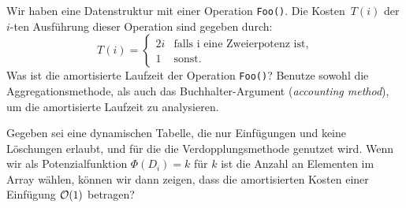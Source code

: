 \documentclass{uebung_cs}
\begin{document}
\begin{aufgabe}
	Wir haben eine Datenstruktur mit einer Operation \texttt{Foo()}. Die Kosten~$T(i)$ der $i$-ten Ausführung dieser Operation sind gegeben durch: 
	\[T(i) = \begin{cases} 2i & \text{falls i eine Zweierpotenz ist}, \\ 1 & \text{sonst}. \end{cases}\] 
	Was ist die amortisierte Laufzeit der Operation \texttt{Foo()}? Benutze sowohl die Aggregationsmethode, als auch das Buchhalter-Argument (\textit{accounting method}), um die amortisierte Laufzeit zu analysieren.
\end{aufgabe}    

\begin{aufgabe}
	Gegeben sei eine dynamischen Tabelle, die nur Einfügungen und keine Löschungen erlaubt, und für die die Verdopplungsmethode genutzet wird. Wenn wir als Potenzialfunktion $\Phi(D_i) = k$ für $k$ ist die Anzahl an Elementen im Array wählen, können wir dann zeigen, dass die amortisierten Kosten einer Einfügung $\mathcal{O}(1)$ betragen?
\end{aufgabe}
\end{document}
